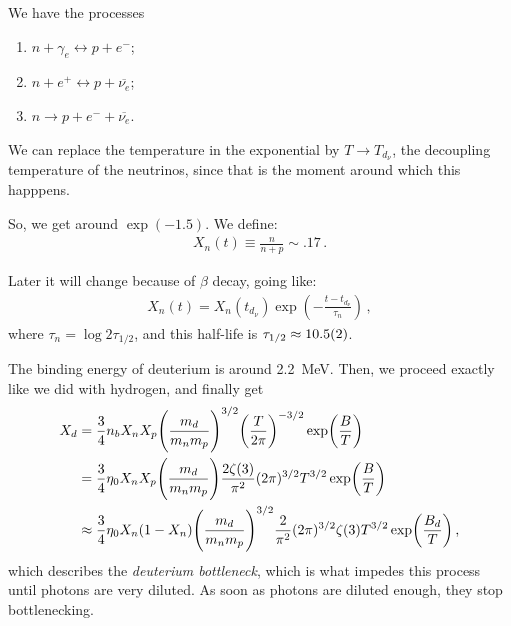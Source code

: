 \documentclass[main.tex]{subfiles}
\begin{document}
We have the processes 
\begin{enumerate}
    \item \(n + \gamma _e \leftrightarrow p + e^{-}\);
    \item \(n + e^{+} \leftrightarrow p + \overline{\nu _e} \);
    \item \(n \rightarrow p + e^{-} + \overline{\nu _e} \).
\end{enumerate}

We can replace the temperature in the exponential by \(T \rightarrow T_{d_\nu }\), the decoupling temperature of the neutrinos, since that is the moment around which this happpens.

So, we get around \(\exp(-1.5)\).
We define: 
%
\begin{align}
  X_n (t) \equiv \frac{n}{n+p} \sim \num{.17}
\,.
\end{align}

Later it will change because of \(\beta \) decay, going like: 
%
\begin{align}
  X_n(t) = X_n(t_{d_\nu }) \exp( - \frac{t - t_{d_\nu }}{\tau _n})
\,,
\end{align}
%
where \(\tau _n = \log 2 \tau_{1/2}\), and this half-life is \(\tau_{1/2} \approx \num{10.5+-0.2}\).

The binding energy of deuterium is around \SI{2.2}{MeV}.
Then, we proceed exactly like we did with hydrogen, and finally get 
%
\begin{subequations}
\begin{align}
  X_d &= \frac{3}{4} n_b X_n X_p \qty(\frac{m_d}{m_nm_p})^{3/2} \qty(\frac{T}{2 \pi })^{-3/2} \exp(\frac{B}{T}) \\
  &= \frac{3}{4} \eta_0 X_n X_p \qty(\frac{m_d}{m_nm_p})
  \frac{2 \zeta (3)}{\pi^2} (2 \pi )^{3/2} T^{3/2} \exp(\frac{B}{T})  \\
  &\approx \frac{3}{4} \eta_0 X_n (1-X_n) \qty(\frac{m_d}{m_nm_p})^{3/2} \frac{2}{\pi^2} (2 \pi )^{3/2} \zeta (3) T^{3/2} \exp(\frac{B_d}{T})
\,,
\end{align}
\end{subequations}
%
which describes the \emph{deuterium bottleneck}, which is what impedes this process until photons are very diluted.
As soon as photons are diluted enough, they stop bottlenecking.
\end{document}
